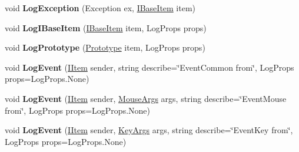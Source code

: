 \begin{DoxyCompactItemize}
\item 
\mbox{\label{class_space_v_i_l_1_1_common_1_1_log_service_ac8eed01748a51f5c5147b672d0a168f2}} 
void {\bfseries Log\+Exception} (Exception ex, \mbox{\hyperlink{interface_space_v_i_l_1_1_core_1_1_i_base_item}{I\+Base\+Item}} item)
\item 
\mbox{\label{class_space_v_i_l_1_1_common_1_1_log_service_a70d68fc25e46843461d68c49ece881af}} 
void {\bfseries Log\+I\+Base\+Item} (\mbox{\hyperlink{interface_space_v_i_l_1_1_core_1_1_i_base_item}{I\+Base\+Item}} item, Log\+Props props)
\item 
\mbox{\label{class_space_v_i_l_1_1_common_1_1_log_service_aeab9affba62bb09a3dd618c98f19093d}} 
void {\bfseries Log\+Prototype} (\mbox{\hyperlink{class_space_v_i_l_1_1_prototype}{Prototype}} item, Log\+Props props)
\item 
\mbox{\label{class_space_v_i_l_1_1_common_1_1_log_service_a538cb22ba99e03cc753bfd559b651e88}} 
void {\bfseries Log\+Event} (\mbox{\hyperlink{interface_space_v_i_l_1_1_core_1_1_i_item}{I\+Item}} sender, string describe=\char`\"{}Event\+Common from\char`\"{}, Log\+Props props=Log\+Props.\+None)
\item 
\mbox{\label{class_space_v_i_l_1_1_common_1_1_log_service_ab0ce52cc615eda9765579783a9e1f6ed}} 
void {\bfseries Log\+Event} (\mbox{\hyperlink{interface_space_v_i_l_1_1_core_1_1_i_item}{I\+Item}} sender, \mbox{\hyperlink{class_space_v_i_l_1_1_core_1_1_mouse_args}{Mouse\+Args}} args, string describe=\char`\"{}Event\+Mouse from\char`\"{}, Log\+Props props=Log\+Props.\+None)
\item 
\mbox{\label{class_space_v_i_l_1_1_common_1_1_log_service_a27823861e0d3677043006a5eb1e80218}} 
void {\bfseries Log\+Event} (\mbox{\hyperlink{interface_space_v_i_l_1_1_core_1_1_i_item}{I\+Item}} sender, \mbox{\hyperlink{class_space_v_i_l_1_1_core_1_1_key_args}{Key\+Args}} args, string describe=\char`\"{}Event\+Key from\char`\"{}, Log\+Props props=Log\+Props.\+None)
\item 
\mbox{\label{class_space_v_i_l_1_1_common_1_1_log_service_a7f073ea2876415b9b5bb529078876f11}} 

\end{DoxyCompactItemize}
